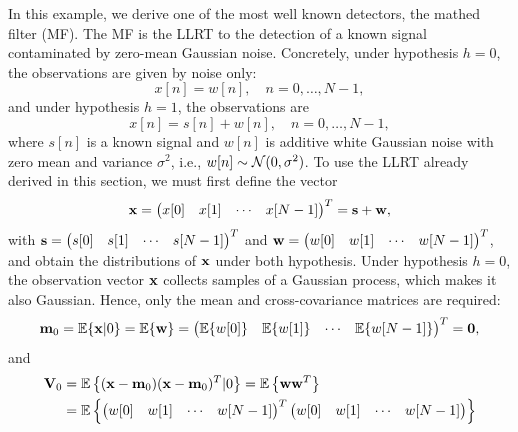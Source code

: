 \begin{example}
	In this example, we derive one of the most well known detectors, the mathed filter (MF). The MF is the LLRT to the detection of a known signal contaminated by zero-mean Gaussian noise. Concretely, under hypothesis $h=0$, the observations are given by noise only:
	\begin{equation*}
	x[n] = w[n], \quad n = 0, \ldots, N-1,
	\end{equation*}
	and under  hypothesis $h=1$, the observations are
	\begin{equation*}
	x[n] = s[n] + w[n], \quad n = 0, \ldots, N-1,
	\end{equation*}
	where $s[n]$ is a known signal and $w[n]$ is additive white Gaussian noise with zero mean and variance $\sigma^2$, i.e., $w[n] \sim {\mathcal N}(0,\sigma^2)$. To use the LLRT already derived in this section, we must first define the vector
	\begin{equation*}
	{\bf x} = \begin{pmatrix} x[0] & x[1] & \cdots & x[N-1] \end{pmatrix}^T = {\bf s} + {\bf w},
	\end{equation*}
	with ${\bf s} = \begin{pmatrix} s[0] & s[1] & \cdots & s[N-1] \end{pmatrix}^T $ and ${\bf w} = \begin{pmatrix} w[0] & w[1] & \cdots & w[N-1] \end{pmatrix}^T$, and obtain the distributions of ${\bf x}$ under both hypothesis. Under hypothesis $h=0$, the observation vector ${\bf x}$ collects samples of a Gaussian process, which makes it also Gaussian. Hence, only the mean and cross-covariance matrices are required:
	\begin{equation*}
	{\bf m}_0 = \mathbb{E}\{{\bf x}|0\} = \mathbb{E}\{{\bf w}\} = \begin{pmatrix} \mathbb{E}\{w[0]\}  & \mathbb{E}\{w[1]\} & \cdots & \mathbb{E}\{w[N-1]\} \end{pmatrix}^T = \mathbf{0},
	\end{equation*}
    and
	\begin{align*}
		{\bf V}_0 &= \mathbb{E}\left\{({\bf x} - {\bf m}_0) ({\bf x} - {\bf m}_0)^T|0\right\} = \mathbb{E}\left\{{\bf w} {\bf w}^T\right\} \\ &= \mathbb{E}\left\{\begin{pmatrix} w[0] & w[1] & \cdots & w[N-1] \end{pmatrix}^T \begin{pmatrix} w[0] & w[1] & \cdots & w[N-1] \end{pmatrix}\right\} \\

\end{align*}
\end{example}
